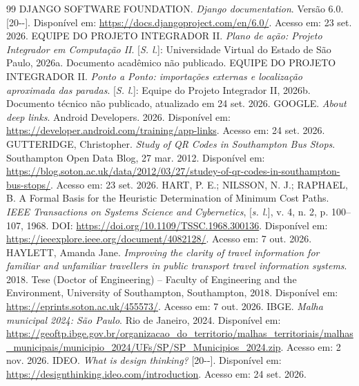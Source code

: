 \documentclass[12pt,oneside,a4paper,brazil,chapter=TITLE]{abntex2}
\begin{document}
\begin{thebibliography}{99}
 DJANGO SOFTWARE FOUNDATION. \textit{Django documentation}. Versão 6.0. [20\mbox{-}\mbox{-}]. Disponível em: \url{https://docs.djangoproject.com/en/6.0/}. Acesso em: 23 set. 2026.
 EQUIPE DO PROJETO INTEGRADOR II. \textit{Plano de ação: Projeto Integrador em Computação II}. [\textit{S. l.}]: Universidade Virtual do Estado de São Paulo, 2026a. Documento acadêmico não publicado.
 EQUIPE DO PROJETO INTEGRADOR II. \textit{Ponto a Ponto: importações externas e localização aproximada das paradas}. [\textit{S. l.}]: Equipe do Projeto Integrador II, 2026b. Documento técnico não publicado, atualizado em 24 set. 2026.
 GOOGLE. \textit{About deep links}. Android Developers. 2026. Disponível em: \url{https://developer.android.com/training/app-links}. Acesso em: 24 set. 2026.
 GUTTERIDGE, Christopher. \textit{Study of QR Codes in Southampton Bus Stops}. Southampton Open Data Blog, 27 mar. 2012. Disponível em: \url{https://blog.soton.ac.uk/data/2012/03/27/studey-of-qr-codes-in-southampton-bus-stops/}. Acesso em: 23 set. 2026.
 HART, P. E.; NILSSON, N. J.; RAPHAEL, B. A Formal Basis for the Heuristic Determination of Minimum Cost Paths. \textit{IEEE Transactions on Systems Science and Cybernetics}, [\textit{s. l.}], v. 4, n. 2, p. 100--107, 1968. DOI: \url{https://doi.org/10.1109/TSSC.1968.300136}. Disponível em: \url{https://ieeexplore.ieee.org/document/4082128/}. Acesso em: 7 out. 2026.
 HAYLETT, Amanda Jane. \textit{Improving the clarity of travel information for familiar and unfamiliar travellers in public transport travel information systems}. 2018. Tese (Doctor of Engineering) -- Faculty of Engineering and the Environment, University of Southampton, Southampton, 2018. Disponível em: \url{https://eprints.soton.ac.uk/455573/}. Acesso em: 7 out. 2026.
 IBGE. \textit{Malha municipal 2024: São Paulo}. Rio de Janeiro, 2024. Disponível em: \url{https://geoftp.ibge.gov.br/organizacao_do_territorio/malhas_territoriais/malhas_municipais/municipio_2024/UFs/SP/SP_Municipios_2024.zip}. Acesso em: 2 nov. 2026.
\setlength{\bibsep}{\baselineskip}
 IDEO. \textit{What is design thinking?} [20\mbox{-}\mbox{-}]. Disponível em: \url{https://designthinking.ideo.com/introduction}. Acesso em: 24 set. 2026.

\end{thebibliography}
\end{document}
